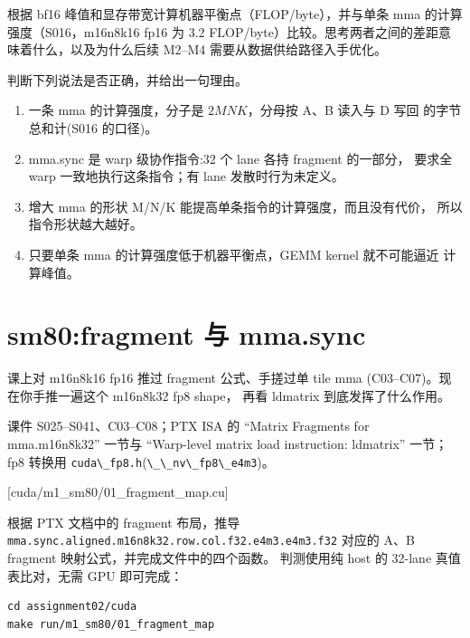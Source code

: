 \documentclass[11pt,a4paper,fontset=none]{ctexart}
\providecommand{\passthrough}[1]{#1}
\begin{document}
根据 bf16 峰值和显存带宽计算机器平衡点（FLOP/byte），并与单条 mma
的计算强度（S016，m16n8k16 fp16 为 3.2
FLOP/byte）比较。思考两者之间的差距意味着什么，以及为什么后续 M2--M4
需要从数据供给路径入手优化。


判断下列说法是否正确，并给出一句理由。

\begin{enumerate}
\def\labelenumi{(\alph{enumi})}
\item
  一条 mma 的计算强度，分子是 \(2MNK\)，分母按 A、B 读入与 D 写回
  的字节总和计(S016 的口径)。
\item
  mma.sync 是 warp 级协作指令:32 个 lane 各持 fragment 的一部分， 要求全
  warp 一致地执行这条指令；有 lane 发散时行为未定义。
\item
  增大 mma 的形状 M/N/K 能提高单条指令的计算强度，而且没有代价，
  所以指令形状越大越好。
\item
  只要单条 mma 的计算强度低于机器平衡点，GEMM kernel 就不可能逼近
  计算峰值。
\end{enumerate}

\hypertarget{sm80fragment-ux4e0e-mma.sync}{%
\section{sm80:fragment 与 mma.sync}\label{sm80fragment-ux4e0e-mma.sync}}

课上对 m16n8k16 fp16 推过 fragment 公式、手搓过单 tile mma
(C03--C07)。现在你手推一遍这个 m16n8k32 fp8 shape， 再看 ldmatrix
到底发挥了什么作用。

\begin{reading}

课件 S025--S041、C03--C08；PTX ISA 的 ``Matrix Fragments for
mma.m16n8k32'' 一节与 ``Warp-level matrix load instruction: ldmatrix''
一节；fp8 转换用
\passthrough{\lstinline!cuda\_fp8.h!}(\passthrough{\lstinline!\_\_nv\_fp8\_e4m3!})。

\end{reading}

[cuda/m1\_sm80/01\_fragment\_map.cu]

根据 PTX 文档中的 fragment 布局，推导
\passthrough{\lstinline!mma.sync.aligned.m16n8k32.row.col.f32.e4m3.e4m3.f32!}
对应的 A、B fragment 映射公式，并完成文件中的四个函数。 判测使用纯 host
的 32-lane 真值表比对，无需 GPU 即可完成：

\begin{lstlisting}
cd assignment02/cuda
make run/m1_sm80/01_fragment_map
\end{lstlisting}
\end{document}
